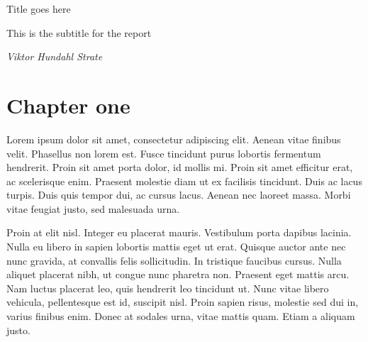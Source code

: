 \documentclass[12pt,a4paper]{article}
\begin{document}
    \begin{titlepage}
        \begin{center}
            \vspace*{1.5cm}

            \begin{huge}
            Title goes here
            \end{huge}

            \vspace{2mm}

            \begin{Large}
             This is the subtitle for the report
            \end{Large}

            \vspace{8mm}

            \textit{Viktor Hundahl Strate}

            \vfill


            \vfill

        \end{center}
    \end{titlepage}

    \tableofcontents

    \pagebreak

    \section{Chapter one}
    Lorem ipsum dolor sit amet, consectetur adipiscing elit. Aenean vitae finibus velit. Phasellus non lorem est. Fusce tincidunt purus lobortis fermentum hendrerit. Proin sit amet porta dolor, id mollis mi. Proin sit amet efficitur erat, ac scelerisque enim. Praesent molestie diam ut ex facilisis tincidunt. Duis ac lacus turpis. Duis quis tempor dui, ac cursus lacus. Aenean nec laoreet massa. Morbi vitae feugiat justo, sed malesuada urna.

    Proin at elit nisl. Integer eu placerat mauris. Vestibulum porta dapibus lacinia. Nulla eu libero in sapien lobortis mattis eget ut erat. Quisque auctor ante nec nunc gravida, at convallis felis sollicitudin. In tristique faucibus cursus. Nulla aliquet placerat nibh, ut congue nunc pharetra non. Praesent eget mattis arcu. Nam luctus placerat leo, quis hendrerit leo tincidunt ut. Nunc vitae libero vehicula, pellentesque est id, suscipit nisl. Proin sapien risus, molestie sed dui in, varius finibus enim. Donec at sodales urna, vitae mattis quam. Etiam a aliquam justo.

    \pagebreak


    
\end{document}
